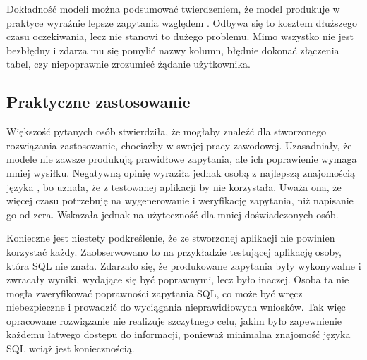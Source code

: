 Dokładność modeli można podsumować twierdzeniem, że model  produkuje w praktyce wyraźnie lepsze zapytania względem . Odbywa się to kosztem dłuższego czasu oczekiwania, lecz nie stanowi to dużego problemu. Mimo wszystko  nie jest bezbłędny i zdarza mu się pomylić nazwy kolumn, błędnie dokonać złączenia tabel, czy niepoprawnie zrozumieć żądanie użytkownika.

\subsection{Praktyczne zastosowanie}
Większość pytanych osób stwierdziła, że mogłaby znaleźć dla stworzonego rozwiązania zastosowanie, chociażby w swojej pracy zawodowej. Uzasadniały, że modele nie zawsze produkują prawidłowe zapytania, ale ich poprawienie wymaga mniej wysiłku. Negatywną opinię wyraziła jednak osobą z najlepszą znajomością języka , bo uznała, że z testowanej aplikacji by nie korzystała. Uważa ona, że więcej czasu potrzebuję na wygenerowanie i weryfikację zapytania, niż napisanie go od zera. Wskazała jednak na użyteczność dla mniej doświadczonych osób.

Konieczne jest niestety podkreślenie, że ze stworzonej aplikacji nie powinien korzystać każdy. Zaobserwowano to na przykładzie testującej aplikację osoby, która SQL nie znała. Zdarzało się, że produkowane zapytania były wykonywalne i zwracały wyniki, wydające się być poprawnymi, lecz było inaczej. Osoba ta nie mogła zweryfikować poprawności zapytania SQL, co może być wręcz niebezpieczne i prowadzić do wyciągania nieprawidłowych wniosków. Tak więc opracowane rozwiązanie nie realizuje szczytnego celu, jakim było zapewnienie każdemu łatwego dostępu do informacji, ponieważ minimalna znajomość języka SQL wciąż jest koniecznością.
